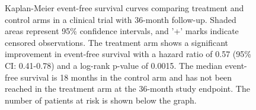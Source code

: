 \begin{figure}[htbp]
    \caption{Kaplan-Meier event-free survival curves comparing treatment and control arms in a clinical trial with 36-month follow-up. Shaded areas represent 95\% confidence intervals, and '+' marks indicate censored observations. The treatment arm shows a significant improvement in event-free survival with a hazard ratio of 0.57 (95\% CI: 0.41-0.78) and a log-rank p-value of 0.0015. The median event-free survival is 18 months in the control arm and has not been reached in the treatment arm at the 36-month study endpoint. The number of patients at risk is shown below the graph.}
    \label{fig:km-clinical}
\end{figure}